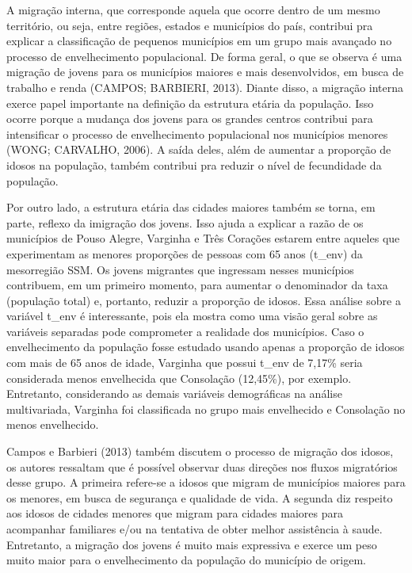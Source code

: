 \documentclass[10pt,twoside]{article}
\begin{document}
A migração interna, que corresponde aquela que ocorre dentro de um mesmo território, ou seja, entre regiões, estados e municípios do país, contribui pra explicar a classificação de pequenos municípios em um grupo mais avançado no processo de envelhecimento populacional. De forma geral, o que se observa é uma migração de jovens para os municípios maiores e mais desenvolvidos, em busca de trabalho e renda (CAMPOS; BARBIERI, 2013). Diante disso, a migração interna exerce papel importante na definição da estrutura etária da população. Isso ocorre porque a mudança dos jovens para os grandes centros contribui para intensificar o processo de envelhecimento populacional nos municípios menores (WONG; CARVALHO, 2006). A saída deles, além de aumentar a proporção de idosos na população, também contribui pra reduzir o nível de fecundidade da população. 

Por outro lado, a estrutura etária das cidades maiores também se torna, em parte, reflexo da imigração dos jovens. Isso ajuda a explicar a razão de os municípios de Pouso Alegre, Varginha e Três Corações estarem entre aqueles que experimentam as menores proporções de pessoas com 65 anos (t\_env) da mesorregião SSM. Os jovens migrantes que ingressam nesses municípios contribuem, em um primeiro momento, para aumentar o denominador da taxa (população total) e, portanto, reduzir a proporção de idosos. Essa análise sobre a variável t\_env é interessante, pois ela mostra como uma visão geral sobre as variáveis separadas pode comprometer a realidade dos municípios. Caso o envelhecimento da população fosse estudado usando apenas a proporção de idosos com mais de 65 anos de idade, Varginha que possui t\_env de 7,17\% seria considerada menos envelhecida que Consolação (12,45\%), por exemplo. Entretanto, considerando as demais variáveis demográficas na análise multivariada, Varginha foi classificada no grupo mais envelhecido e Consolação no menos envelhecido. 

Campos e Barbieri (2013) também discutem o processo de migração dos idosos, os autores ressaltam que é possível observar duas direções nos fluxos migratórios desse grupo. A primeira refere-se a idosos que migram de municípios maiores para os menores, em busca de segurança e qualidade de vida. A segunda diz respeito aos idosos de cidades menores que migram para cidades maiores para acompanhar familiares e/ou na tentativa de obter melhor assistência à saude. Entretanto, a migração dos jovens é muito mais expressiva e exerce um peso muito maior para o envelhecimento da população do município de origem. 
\end{document}
